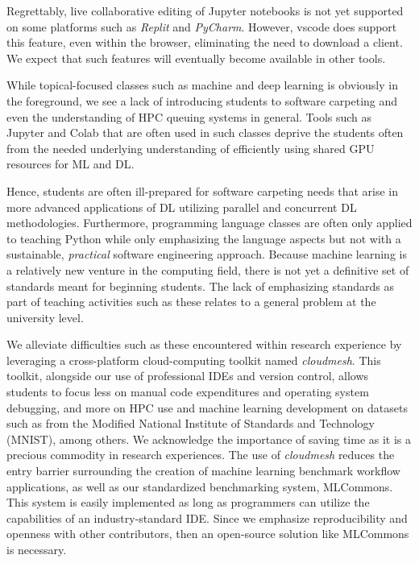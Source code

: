 Regrettably, live collaborative editing of Jupyter notebooks is not yet supported on some platforms such as {\em Replit} and {\em PyCharm}. However, vscode does support this feature, even within the browser, eliminating the need to download a client. We expect that such features will eventually become available in other tools. 

While topical-focused classes such as machine and deep learning is obviously in the foreground, we 
see a lack of introducing students to software carpeting and even the understanding of HPC queuing systems in general. Tools such as Jupyter and Colab that are often used in such classes deprive the students often from the needed underlying understanding of efficiently using shared GPU resources for ML and DL. 

Hence, students are often ill-prepared for software carpeting needs that arise in more advanced applications of DL utilizing parallel and concurrent DL methodologies. Furthermore, programming language classes are often only applied to teaching Python while only emphasizing the language aspects but not with a sustainable, {\em practical} software engineering approach. Because machine learning is a relatively new venture in the computing field, there is not yet a definitive set of standards meant for beginning students. 
The lack of emphasizing standards as part of teaching activities such as these relates to a general problem at the university level. 


We alleviate difficulties such as these encountered within research experience by leveraging a cross-platform cloud-computing toolkit named {\em cloudmesh}. This toolkit, alongside our use of professional IDEs and version control, allows students to focus less on manual code expenditures and operating system debugging, and more on HPC use and machine learning development on datasets such as from the Modified National Institute of Standards and Technology (MNIST), among others. We acknowledge the importance of saving time as it is a precious commodity in research experiences.  
The use of {\em cloudmesh} reduces the entry barrier surrounding the creation of machine learning benchmark workflow applications, as well as our standardized benchmarking system, MLCommons. This system is easily implemented as long as programmers can utilize the capabilities of an industry-standard IDE. Since we emphasize reproducibility and openness with other contributors, then an open-source solution like MLCommons is necessary.



